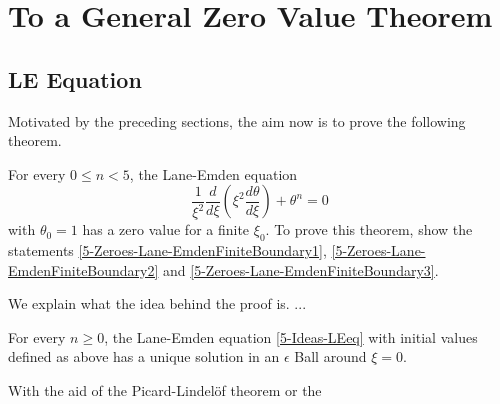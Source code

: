 \section{To a General Zero Value Theorem}
\subsection{LE Equation}
Motivated by the preceding sections, the aim now is to prove the following theorem.
\begin{theorem}
	\label{5-Zeroes-Lane-EmdenFiniteBoundary}
	For every $0\leq n<5$, the Lane-Emden equation
	\begin{equation}
		\frac{1}{\xi^2}\frac{d}{d\xi}\left(\xi^2\frac{d\theta}{d\xi}\right)+\theta^n=0
		\label{5-Ideas-LEeq}
	\end{equation}
	with $\theta_0=1$ has a zero value for a finite $\xi_0$. To prove this theorem, show the statements \ref{5-Zeroes-Lane-EmdenFiniteBoundary1}, 
	\ref{5-Zeroes-Lane-EmdenFiniteBoundary2} and \ref{5-Zeroes-Lane-EmdenFiniteBoundary3}.
\end{theorem}
We explain what the idea behind the proof is.
...
\begin{lemma}
	\label{5-Zeroes-Lane-EmdenFiniteBoundary1}
	For every $n\geq0$, the Lane-Emden equation \ref{5-Ideas-LEeq} with initial values defined as above has a unique solution in an $\epsilon$ Ball around $\xi=0$.
\end{lemma}
With the aid of the Picard-Lindelöf theorem or the 

